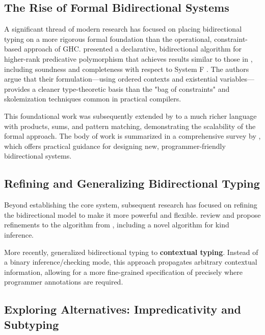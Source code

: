 \subsection{The Rise of Formal Bidirectional Systems}

A significant thread of modern research has focused on placing bidirectional typing on a more rigorous formal foundation than the operational, constraint-based approach of GHC. \citeauthor{dunfield-complete-2013} \cite{dunfield-complete-2013} presented a declarative, bidirectional algorithm for higher-rank predicative polymorphism that achieves results similar to those in \cite{jones-practical-2007}, including soundness and completeness with respect to System F \cite{selinger-lecture-2013}. The authors argue that their formulation—using ordered contexts and existential variables—provides a cleaner type-theoretic basis than the "bag of constraints" and skolemization techniques common in practical compilers.

This foundational work was subsequently extended by \citeauthor{dunfield-sound-2019} \cite{dunfield-sound-2019} to a much richer language with products, sums, and pattern matching, demonstrating the scalability of the formal approach. The body of work is summarized in a comprehensive survey by \citeauthor{dunfield-bidirectional-2020} \cite{dunfield-bidirectional-2020}, which offers practical guidance for designing new, programmer-friendly bidirectional systems.

\subsection{Refining and Generalizing Bidirectional Typing}

Beyond establishing the core system, subsequent research has focused on refining the bidirectional model to make it more powerful and flexible. \citeauthor{xie-higher-rank} \cite{xie-higher-rank} review and propose refinements to the algorithm from \cite{dunfield-complete-2013}, including a novel algorithm for kind inference.

More recently, \citeauthor{xue-contextual-2024} \cite{xue-contextual-2024} generalized bidirectional typing to \textbf{contextual typing}. Instead of a binary inference/checking mode, this approach propagates arbitrary contextual information, allowing for a more fine-grained specification of precisely where programmer annotations are required.

\subsection{Exploring Alternatives: Impredicativity and Subtyping}

